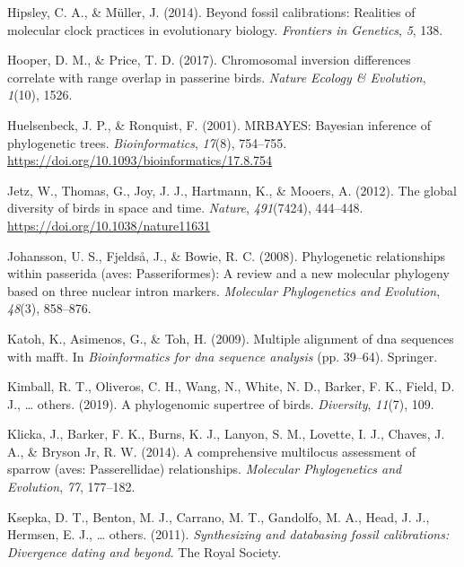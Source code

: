 \documentclass[english,man]{apa6}
\begin{document}
\leavevmode\hypertarget{ref-hipsley2014beyond}{}%
Hipsley, C. A., \& Müller, J. (2014). Beyond fossil calibrations: Realities of molecular clock practices in evolutionary biology. \emph{Frontiers in Genetics}, \emph{5}, 138.

\leavevmode\hypertarget{ref-hooper2017chromosomal}{}%
Hooper, D. M., \& Price, T. D. (2017). Chromosomal inversion differences correlate with range overlap in passerine birds. \emph{Nature Ecology \& Evolution}, \emph{1}(10), 1526.

\leavevmode\hypertarget{ref-Huelsenbeck2001}{}%
Huelsenbeck, J. P., \& Ronquist, F. (2001). MRBAYES: Bayesian inference of phylogenetic trees. \emph{Bioinformatics}, \emph{17}(8), 754--755. \url{https://doi.org/10.1093/bioinformatics/17.8.754}

\leavevmode\hypertarget{ref-Jetz2012}{}%
Jetz, W., Thomas, G., Joy, J. J., Hartmann, K., \& Mooers, A. (2012). The global diversity of birds in space and time. \emph{Nature}, \emph{491}(7424), 444--448. \url{https://doi.org/10.1038/nature11631}

\leavevmode\hypertarget{ref-johansson2008phylogenetic}{}%
Johansson, U. S., Fjeldså, J., \& Bowie, R. C. (2008). Phylogenetic relationships within passerida (aves: Passeriformes): A review and a new molecular phylogeny based on three nuclear intron markers. \emph{Molecular Phylogenetics and Evolution}, \emph{48}(3), 858--876.

\leavevmode\hypertarget{ref-katoh2009multiple}{}%
Katoh, K., Asimenos, G., \& Toh, H. (2009). Multiple alignment of dna sequences with mafft. In \emph{Bioinformatics for dna sequence analysis} (pp. 39--64). Springer.

\leavevmode\hypertarget{ref-kimball2019phylogenomic}{}%
Kimball, R. T., Oliveros, C. H., Wang, N., White, N. D., Barker, F. K., Field, D. J., \ldots{} others. (2019). A phylogenomic supertree of birds. \emph{Diversity}, \emph{11}(7), 109.

\leavevmode\hypertarget{ref-klicka2014comprehensive}{}%
Klicka, J., Barker, F. K., Burns, K. J., Lanyon, S. M., Lovette, I. J., Chaves, J. A., \& Bryson Jr, R. W. (2014). A comprehensive multilocus assessment of sparrow (aves: Passerellidae) relationships. \emph{Molecular Phylogenetics and Evolution}, \emph{77}, 177--182.

\leavevmode\hypertarget{ref-ksepka2011synthesizing}{}%
Ksepka, D. T., Benton, M. J., Carrano, M. T., Gandolfo, M. A., Head, J. J., Hermsen, E. J., \ldots{} others. (2011). \emph{Synthesizing and databasing fossil calibrations: Divergence dating and beyond}. The Royal Society.
\end{document}
